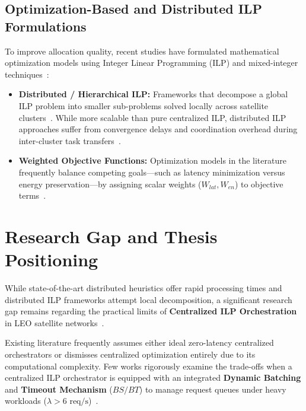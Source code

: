 \subsection{Optimization-Based and Distributed ILP Formulations}

To improve allocation quality, recent studies have formulated mathematical optimization models using Integer Linear Programming (ILP) and mixed-integer techniques~\cite{wolsey1998integer, boyd2004convex}:

\begin{itemize}
    \item \textbf{Distributed / Hierarchical ILP:} Frameworks that decompose a global ILP problem into smaller sub-problems solved locally across satellite clusters~\cite{icdcs_satellite_2025}. While more scalable than pure centralized ILP, distributed ILP approaches suffer from convergence delays and coordination overhead during inter-cluster task transfers~\cite{peng2025blocked}.
    \item \textbf{Weighted Objective Functions:} Optimization models in the literature frequently balance competing goals—such as latency minimization versus energy preservation—by assigning scalar weights ($W_{lat}, W_{en}$) to objective terms~\cite{zhong2025leo, icdcs_satellite_2025}.
\end{itemize}

\section{Research Gap and Thesis Positioning}
\label{sec:bg_research_gap}

While state-of-the-art distributed heuristics offer rapid processing times and distributed ILP frameworks attempt local decomposition, a significant research gap remains regarding the practical limits of \textbf{Centralized ILP Orchestration} in LEO satellite networks~\cite{icdcs_satellite_2025, survey_orbital_edge_2023}.

Existing literature frequently assumes either ideal zero-latency centralized orchestrators or dismisses centralized optimization entirely due to its computational complexity. Few works rigorously examine the trade-offs when a centralized ILP orchestrator is equipped with an integrated \textbf{Dynamic Batching} and \textbf{Timeout Mechanism} ($BS / BT$) to manage request queues under heavy workloads ($\lambda > 6 \text{ req/s}$)~\cite{icdcs_satellite_2025}.

